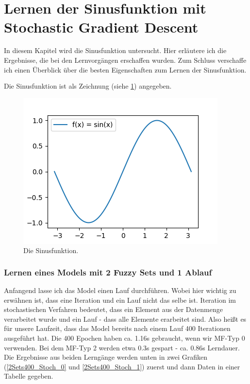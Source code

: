 \section{Lernen der Sinusfunktion mit Stochastic Gradient Descent}
In diesem Kapitel wird die Sinusfunktion untersucht. Hier erläutere ich die Ergebnisse, die bei den Lernvorgängen erschaffen wurden. Zum Schluss verschaffe ich einen Überblick über die besten Eigenschaften zum Lernen der Sinusfunktion.

Die Sinusfunktion ist als Zeichnung (siehe \ref{sinus}) angegeben.

\begin{figure}
	\centering
	\includegraphics{images/sinus.png}
	\caption{Die  Sinusfunktion.}
	\label{sinus}
\end{figure} 

\subsubsection{Lernen eines Models mit 2 Fuzzy Sets und 1 Ablauf}

Anfangend lasse ich das Model einen Lauf durchführen. Wobei hier wichtig zu erwähnen ist, dass eine Iteration und ein Lauf nicht das selbe ist. Iteration im stochastischen Verfahren bedeutet, dass ein Element aus der Datenmenge verarbeitet wurde und ein Lauf - dass alle Elemente erarbeitet sind. Also heißt es für unsere Laufzeit, dass das Model bereits nach einem Lauf 400 Iterationen ausgeführt hat. Die 400 Epochen haben ca. 1.16s gebraucht, wenn wir MF-Typ 0 verwenden. Bei dem MF-Typ 2 werden etwa 0.3s gespart - ca. 0.86s Lerndauer. Die Ergebnisse aus beiden Lerngänge werden unten in zwei Grafiken (\ref{2Sets400_Stoch_0} und \ref{2Sets400_Stoch_1}) zuerst und dann Daten in einer Tabelle gegeben.


